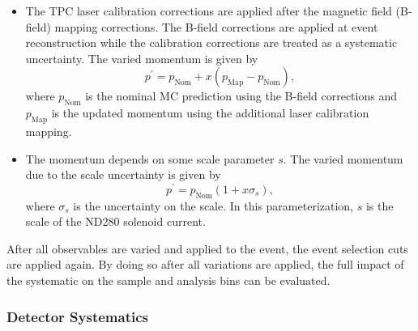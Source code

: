 \begin{itemize}
\item The TPC laser calibration corrections are applied after the magnetic
field (B-field) mapping corrections. The B-field corrections are applied
at event reconstruction while the calibration corrections are treated
as a systematic uncertainty. The varied momentum is given by
\begin{equation}
p^{\prime}=p_{\text{Nom}}+x\left(p_{\text{Map}}-p_{\text{Nom}}\right),\label{eq:obsvariationtpclaser}
\end{equation}
where $p_{\text{Nom}}$ is the nominal MC prediction using the B-field
corrections and $p_{\text{Map}}$ is the updated momentum using the
additional laser calibration mapping.
\item The momentum depends on some scale parameter $s$. The varied momentum
due to the scale uncertainty is given by
\begin{equation}
p^{\prime}=p_{\text{Nom}}\left(1+x\sigma_{s}\right),\label{eq:obsvariationtpcmomentumscale}
\end{equation}
where $\sigma_{s}$ is the uncertainty on the scale. In this parameterization,
$s$ is the scale of the ND280 solenoid current.
\end{itemize}
After all observables are varied and applied to the event, the event
selection cuts are applied again. By doing so after all variations
are applied, the full impact of the systematic on the sample and analysis
bins can be evaluated.

\subsubsection{Detector Systematics\label{subsec:Detector-Systematics}}


